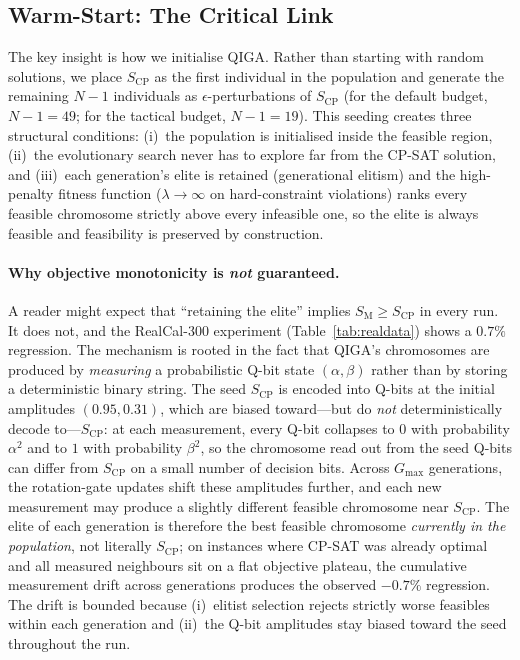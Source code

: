 \documentclass[12pt,number]{elsarticle}
\begin{document}
\subsection{Warm-Start: The Critical Link}

The key insight is how we initialise QIGA. Rather than starting with random solutions, we place $S_{\mathrm{CP}}$ as the first individual in the population and generate the remaining $N-1$ individuals as $\epsilon$-perturbations of $S_{\mathrm{CP}}$ (for the default budget, $N-1 = 49$; for the tactical budget, $N-1 = 19$). This seeding creates three structural conditions: (i)~the population is initialised inside the feasible region, (ii)~the evolutionary search never has to explore far from the CP-SAT solution, and (iii)~each generation's elite is retained (generational elitism) and the high-penalty fitness function ($\lambda \to \infty$ on hard-constraint violations) ranks every feasible chromosome strictly above every infeasible one, so the elite is always feasible and feasibility is preserved by construction.

\paragraph*{Why objective monotonicity is \emph{not} guaranteed.} A reader might expect that ``retaining the elite'' implies $S_{\mathrm{M}} \geq S_{\mathrm{CP}}$ in every run. It does not, and the RealCal-300 experiment (Table~\ref{tab:realdata}) shows a $0.7\%$ regression. The mechanism is rooted in the fact that QIGA's chromosomes are produced by \emph{measuring} a probabilistic Q-bit state $(\alpha, \beta)$ rather than by storing a deterministic binary string. The seed $S_{\mathrm{CP}}$ is encoded into Q-bits at the initial amplitudes $(0.95, 0.31)$, which are biased toward---but do \emph{not} deterministically decode to---$S_{\mathrm{CP}}$: at each measurement, every Q-bit collapses to $0$ with probability $\alpha^2$ and to $1$ with probability $\beta^2$, so the chromosome read out from the seed Q-bits can differ from $S_{\mathrm{CP}}$ on a small number of decision bits. Across $G_{\max}$ generations, the rotation-gate updates shift these amplitudes further, and each new measurement may produce a slightly different feasible chromosome near $S_{\mathrm{CP}}$. The elite of each generation is therefore the best feasible chromosome \emph{currently in the population}, not literally $S_{\mathrm{CP}}$; on instances where CP-SAT was already optimal and all measured neighbours sit on a flat objective plateau, the cumulative measurement drift across generations produces the observed $-0.7\%$ regression. The drift is bounded because (i)~elitist selection rejects strictly worse feasibles within each generation and (ii)~the Q-bit amplitudes stay biased toward the seed throughout the run.
\end{document}
